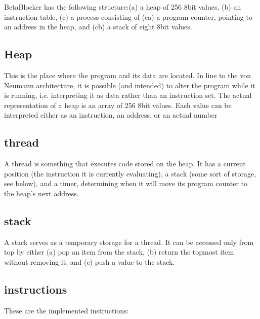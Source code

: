 \documentclass[letterpaper, 12pt]{article}
\begin{document}
BetaBlocker has the following structure:(a) a heap of 256 8bit values, (b) an instruction table, (c) a process consisting of (ca) a program counter, pointing to an address in the heap, and (cb) a stack of eight 8bit values.

\subsection{Heap} 
\label{sub:heap}
This is the place where the program and its data are located. In line to the von Neumann architecture, it is possible (and intended) to alter the program while it is running, i.e. interpreting it as data rather than an instruction set. The actual representation of a heap is an array of 256 8bit values. Each value can be interpreted either as an instruction, an address, or an actual number


\subsection{thread} 
\label{sub:thread}
A thread is something that executes code stored on the heap. It has a current position (the instruction it is currently evaluating), a stack (some sort of storage, see below), and a timer, determining when it will move its program counter to the heap's next address.

\subsection{stack} 
\label{sub:stack}
A stack serves as a temporary storage for a thread. It can be accessed only from top by either (a) pop an item from the stack, (b) return the topmost item without removing it, and (c) push a value to the stack.


\subsection{instructions} 
\label{sub:instructions}


These are the implemented instructions:
\end{document}
